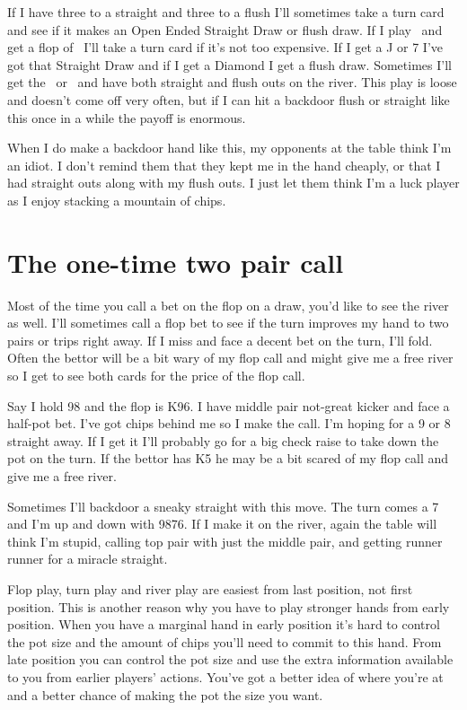 If I have three to a straight and three to a flush I'll sometimes
take a turn card and see if it makes an Open Ended Straight Draw or
flush draw. If I play \tend\nined\ and get a flop of \Ah\eigd\twoc\ I'll take a
turn card if it's not too expensive. If I get a J or 7 I've got
that Straight Draw and if I get a Diamond I get a flush draw.
Sometimes I'll get the \Jd\ or \sevd\ and have both straight
and flush outs on the river. This play is loose and doesn't
come off very often, but if I can hit a backdoor flush or straight
like this once in a while the payoff is enormous.

When I do make a backdoor hand like this, my opponents at the table
think I'm an idiot. I don't remind them that they kept me in
the hand cheaply, or that I had straight outs along with my flush
outs. I just let them think I'm a luck player as I enjoy stacking a
mountain of chips.

\section{The one-time two pair call}

Most of the time you call a bet on the flop on a draw, you'd like to
see the river as well. I'll sometimes call a flop bet to see if the
turn improves my hand to two pairs or trips right away.
If I miss and face a decent bet on the turn, I'll fold.
Often the bettor will be a bit wary of my flop call and might
give me a free river so I get to see both cards for the price of the flop call.

Say I hold 98 and the flop is K96. I have middle pair not-great
kicker and face a half-pot bet. I've got chips behind me so I make
the call. I'm hoping for a 9 or 8 straight away. If I get it I'll
probably go for a big check raise to take down the pot on the turn. If
the bettor has K5 he may be a bit scared of my flop call and give
me a free river.

Sometimes I'll backdoor a sneaky straight with this move. The turn comes
a 7 and I'm up and down with 9876. If I make it on the river,
again the table will think I'm stupid, calling top pair with just the
middle pair, and getting runner runner for a miracle straight.

Flop play, turn play and river play are easiest from last position, not
first position. This is another reason why you have to play stronger hands
from early position. When you have a marginal hand in early position
it's hard to control the pot size and the amount of chips
you'll need to commit to this hand. From late position you can control
the pot size and use the extra information available to you from
earlier players' actions. You've got a better idea of where you're at
and a better chance of making the pot the size you want.

